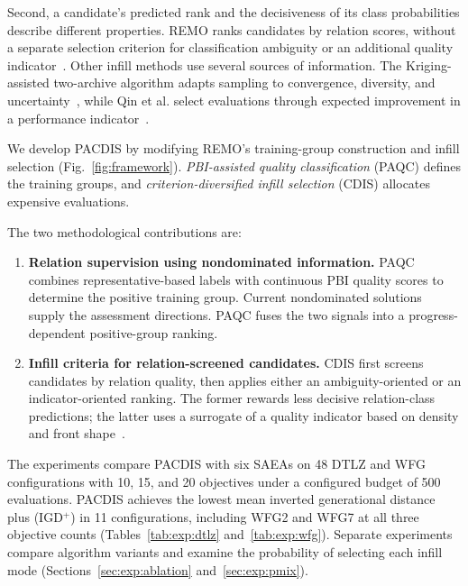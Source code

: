 \documentclass[final,5p,times,twocolumn]{elsarticle}
\begin{document}
Second, a candidate's predicted rank and the decisiveness of its class
probabilities describe different properties. REMO ranks candidates by relation
scores, without a separate selection criterion for classification ambiguity or
an additional quality indicator~\cite{ref:remo}. Other infill methods use several
sources of information. The Kriging-assisted two-archive algorithm adapts
sampling to convergence, diversity, and uncertainty~\cite{ref:kta2}, while Qin
et al. select evaluations through expected improvement in a performance
indicator~\cite{ref:emmoea}.

We develop PACDIS by modifying REMO's training-group construction and infill
selection (Fig.~\ref{fig:framework}). \emph{PBI-assisted quality classification}
(PAQC) defines the training groups, and \emph{criterion-diversified infill
selection} (CDIS) allocates expensive evaluations.

The two methodological contributions are:
\begin{enumerate}[leftmargin=*,nosep]
\item \textbf{Relation supervision using nondominated information.}
PAQC combines representative-based labels with continuous PBI quality scores to
determine the positive training group. Current nondominated solutions supply
the assessment directions. PAQC fuses the two signals into a
progress-dependent positive-group ranking.
\item \textbf{Infill criteria for relation-screened candidates.}
CDIS first screens candidates by relation quality, then applies either an
ambiguity-oriented or an indicator-oriented ranking. The former rewards less
decisive relation-class predictions; the latter uses a surrogate of a quality
indicator based on density and front shape~\cite{ref:sde,ref:piea}.
\end{enumerate}

The experiments compare PACDIS with six SAEAs on 48 DTLZ and WFG configurations with 10,
15, and 20 objectives under a configured budget of 500 evaluations.
PACDIS achieves the lowest mean inverted generational distance plus (IGD$^+$)
in 11 configurations, including WFG2 and WFG7 at all three
objective counts (Tables~\ref{tab:exp:dtlz} and~\ref{tab:exp:wfg}).
Separate experiments compare algorithm variants and examine the probability
of selecting each infill mode
(Sections~\ref{sec:exp:ablation} and~\ref{sec:exp:pmix}).
\end{document}
